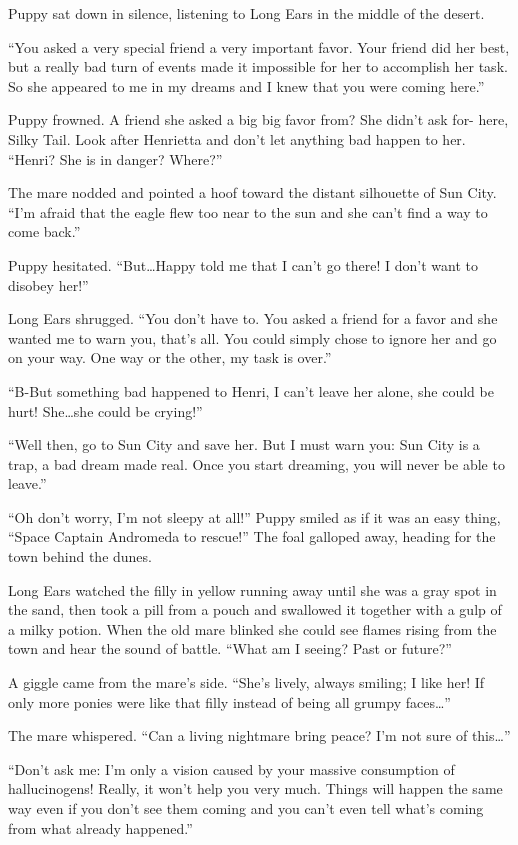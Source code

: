Puppy sat down in silence, listening to Long Ears in the middle of the desert.

``You asked a very special friend a very important favor. Your friend did her best, but a really bad turn of events made it impossible for her to accomplish her task. So she appeared to me in my dreams and I knew that you were coming here.''

Puppy frowned. A friend she asked a big big favor from? She didn't ask for- here, Silky Tail. Look after Henrietta and don't let anything bad happen to her. ``Henri? She is in danger? Where?''

The mare nodded and pointed a hoof toward the distant silhouette of Sun City. ``I'm afraid that the eagle flew too near to the sun and she can't find a way to come back.''

Puppy hesitated. ``But\dots Happy told me that I can't go there! I don't want to disobey her!''

Long Ears shrugged. ``You don't have to. You asked a friend for a favor and she wanted me to warn you, that's all. You could simply chose to ignore her and go on your way. One way or the other, my task is over.''

``B-But something bad happened to Henri, I can't leave her alone, she could be hurt! She\dots she could be crying!''

``Well then, go to Sun City and save her. But I must warn you: Sun City is a trap, a bad dream made real. Once you start dreaming, you will never be able to leave.''

``Oh don't worry, I'm not sleepy at all!'' Puppy smiled as if it was an easy thing, ``Space Captain Andromeda to rescue!'' The foal galloped away, heading for the town behind the dunes.

Long Ears watched the filly in yellow running away until she was a gray spot in the sand, then took a pill from a pouch and swallowed it together with a gulp of a milky potion. When the old mare blinked she could see flames rising from the town and hear the sound of battle. ``What am I seeing? Past or future?''

A giggle came from the mare's side. ``She's lively, always smiling; I like her! If only more ponies were like that filly instead of being all grumpy faces\dots''

The mare whispered. ``Can a living nightmare bring peace? I'm not sure of this\dots''

``Don't ask me: I'm only a vision caused by your massive consumption of hallucinogens! Really, it won't help you very much. Things will happen the same way even if you don't see them coming and you can't even tell what's coming from what already happened.''

